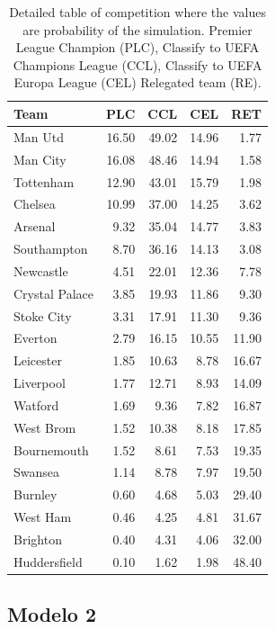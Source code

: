 \documentclass[review]{elsarticle}
\begin{document}
\begin{table}[!h]
\centering
\scriptsize
\begin{tabular}{lrrrr}
  \hline
Team & PLC & CCL& CEL & RET \\ 
  \hline
Man Utd & 16.50 & 49.02 & 14.96 & 1.77 \\ 
  Man City & 16.08 & 48.46 & 14.94 & 1.58 \\ 
  Tottenham & 12.90 & 43.01 & 15.79 & 1.98 \\ 
  Chelsea & 10.99 & 37.00 & 14.25 & 3.62 \\ 
  Arsenal & 9.32 & 35.04 & 14.77 & 3.83 \\ 
  Southampton & 8.70 & 36.16 & 14.13 & 3.08 \\ 
  Newcastle & 4.51 & 22.01 & 12.36 & 7.78 \\ 
  Crystal Palace & 3.85 & 19.93 & 11.86 & 9.30 \\ 
  Stoke City & 3.31 & 17.91 & 11.30 & 9.36 \\ 
  Everton & 2.79 & 16.15 & 10.55 & 11.90 \\ 
  Leicester & 1.85 & 10.63 & 8.78 & 16.67 \\ 
  Liverpool & 1.77 & 12.71 & 8.93 & 14.09 \\ 
  Watford & 1.69 & 9.36 & 7.82 & 16.87 \\ 
  West Brom & 1.52 & 10.38 & 8.18 & 17.85 \\ 
  Bournemouth & 1.52 & 8.61 & 7.53 & 19.35 \\ 
  Swansea & 1.14 & 8.78 & 7.97 & 19.50 \\ 
  Burnley & 0.60 & 4.68 & 5.03 & 29.40 \\ 
  West Ham & 0.46 & 4.25 & 4.81 & 31.67 \\ 
  Brighton & 0.40 & 4.31 & 4.06 & 32.00 \\ 
  Huddersfield & 0.10 & 1.62 & 1.98 & 48.40 \\ 
   \hline
\end{tabular}
    \caption[\scriptsize{TAVB}]{\scriptsize{Detailed table of competition where the values are probability of the simulation. Premier League Champion (PLC), Classify to UEFA Champions League (CCL), Classify to UEFA Europa League (CEL) Relegated team (RE).}}
    \label{tab:forecastdissi}
\end{table}

\subsection{Modelo 2}
\label{sec:mod2}
\end{document}
